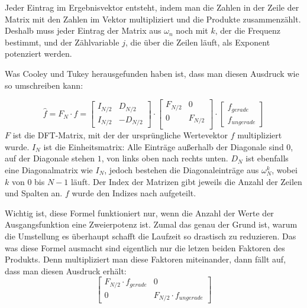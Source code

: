 \documentclass[a4paper,12pt]{article}
\theoremstyle{definition}
\theoremstyle{remark}
\begin{document}
Jeder Eintrag im Ergebnisvektor entsteht, indem man die Zahlen in der Zeile der Matrix 
mit den Zahlen im Vektor multipliziert und die Produkte zusammenzählt. Deshalb muss 
jeder Eintrag der Matrix aus $\omega_n$ noch mit $k$, der die Frequenz bestimmt, und 
der Zählvariable $j$, die über die Zeilen läuft, als Exponent potenziert werden.

Was Cooley und Tukey herausgefunden haben ist, dass man diesen Ausdruck wie so umschreiben 
kann:

\[\hat{f} = F_N \cdot f = 
\begin{bmatrix}
I_{N/2} & D_{N/2} \\
I_{N/2} & -D_{N/2}
\end{bmatrix}
\cdot 
\begin{bmatrix}
  F_{N/2} & 0 \\
  0 & F_{N/2} \\ 
\end{bmatrix}
\cdot 
\begin{bmatrix}
  f_{gerade} \\
  f_{ungerade}
  \end{bmatrix}
  \]
$F$ ist die DFT-Matrix, mit der der ursprüngliche Wertevektor $f$ multipliziert wurde. 
$I_N$ ist die Einheitsmatrix: Alle Einträge außerhalb der Diagonale sind $0$, auf der 
Diagonale stehen $1$, von links oben nach rechts unten. $D_N$ ist ebenfalls eine Diagonalmatrix 
wie $I_N$, jedoch bestehen die Diagonaleinträge aus $\omega_N^k$, wobei $k$ von $0$ bis $N-1$ 
läuft. Der Index der Matrizen gibt jeweils die Anzahl der Zeilen und Spalten an. $f$ wurde den Indizes nach aufgeteilt. 

Wichtig ist, diese Formel funktioniert nur, wenn die Anzahl der Werte der Ausgangsfunktion 
eine Zweierpotenz ist. Zumal das genau der Grund ist, warum die Umstellung es überhaupt schafft die Laufzeit 
so drastisch zu reduzieren. Das was diese Formel ausmacht sind eigentlich nur die letzen beiden 
Faktoren des Produkts. Denn multipliziert man diese Faktoren miteinander, dann fällt auf, dass 
man diesen Ausdruck erhält:
\[
\begin{bmatrix}
F_{N/2} \cdot f_{gerade} & 0 \\
0 & F_{N/2} \cdot f_{ungerade} 
\end{bmatrix}
\]
\end{document}
